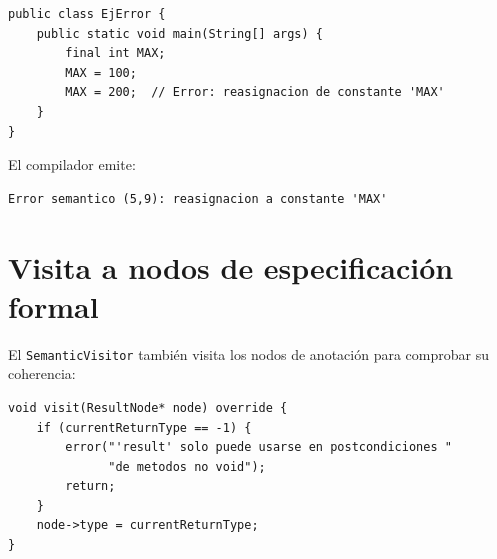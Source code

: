 \begin{lstlisting}[style=java, caption={Reasignación de constante — error semántico}]
public class EjError {
    public static void main(String[] args) {
        final int MAX;
        MAX = 100;
        MAX = 200;  // Error: reasignacion de constante 'MAX'
    }
}
\end{lstlisting}

El compilador emite:
\begin{verbatim}
Error semantico (5,9): reasignacion a constante 'MAX'
\end{verbatim}

\section{Visita a nodos de especificación formal}

El \texttt{SemanticVisitor} también visita los nodos de anotación para
comprobar su coherencia:

\begin{lstlisting}[style=cpp, caption={Visita a ResultNode en el análisis semántico}]
void visit(ResultNode* node) override {
    if (currentReturnType == -1) {
        error("'result' solo puede usarse en postcondiciones "
              "de metodos no void");
        return;
    }
    node->type = currentReturnType;
}
\end{lstlisting}
